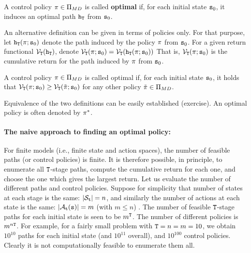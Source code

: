 \begin{definition}
A control policy $\pi\in\Pi_{MD} $ is called \textbf{optimal}
if, for each initial state ${{\tt s}_0}$, it induces an optimal path
${{\tt h}_{\tt T}}$ from ${{\tt s}_0}$.
\end{definition}

An alternative definition can be given in terms of policies only.
For that purpose, let ${{\tt h}_{\tt T}}(\pi ;{{\tt s}_0})$
denote the path induced by the policy $\pi $ from ${{\tt s}_0}$.
For a given return functional
${\mathcal{V}_{\tt T}}({{\tt h}_{\tt T}})$, denote
${\mathcal{V}_{\tt T}}(\pi ;{{\tt s}_0}) =
{\mathcal{V}_{\tt T}}({{\tt h}_{\tt T}}(\pi ;{{\tt s}_0}))$ That
is, ${\mathcal{V}_{\tt T}}(\pi ;{{\tt s}_0})$ is the cumulative
return for the path induced by $\pi $ from ${{\tt s}_0}$.

\begin{definition}
A control policy $\pi \in\Pi_{MD}$ is called optimal if, for
each initial state ${{\tt s}_0}$, it holds that
${\mathcal{V}_{\tt T}}(\pi ;{{\tt s}_0}) \ge
{\mathcal{V}_{\tt T}}(\tilde {\pi} ;{{\tt s}_0})$ for any other policy
$\tilde {\pi} \in\Pi_{MD}$.
\end{definition}

Equivalence of the two definitions can be easily established
(exercise). An optimal policy is often denoted by ${\pi ^*}$.

\vspace{10pt} 


\normalsize
\paragraph{The naive approach to finding an optimal policy:}
For finite models (i.e., finite state and action spaces), the number
of feasible paths (or control policies) is finite.  It is therefore
possible, in principle, to enumerate all ${\tt T}$-stage paths,
compute the cumulative return for each one, and choose the one which
gives the largest return. Let us evaluate the number of different
paths and control policies. Suppose for simplicity that number of
states at each stage is the same: $|{\mathcal{S}_{{\tt t}}}| = n$, and
similarly the number of actions at each state is the same:
$|{\mathcal{A}_{{\tt t}}}({\tt s})| = m$ (with $m \le n$) . The number of
feasible ${\tt T}$-stage paths for each initial state is seen to
be ${m^{\tt T}}$. The number of different policies is
${m^{n{\tt T}}}$. For example, for a fairly small problem with
${\tt T} = n = m = 10$, we obtain ${10^{10}}$ paths for each
initial state (and ${10^{11}}$ overall), and ${10^{100}}$ control
policies. Clearly it is not computationally feasible to enumerate
them all.

